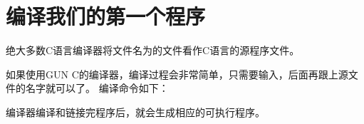 \section{编译我们的第一个程序}
{
    绝大多数C语言编译器将文件名为的文件看作C语言的源程序文件。

    如果使用GUN C的编译器，编译过程会非常简单，只需要输入，后面再跟上源文件的名字就可以了。
    编译命令如下：

    \begin{codelist}
        
    \end{codelist}

    编译器编译和链接完程序后，就会生成相应的可执行程序。
}

\endinput

